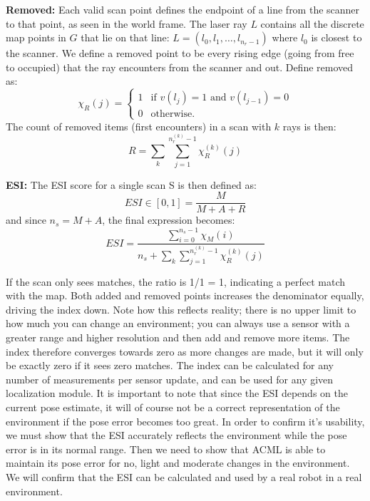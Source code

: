 \textbf{Removed:}
Each valid scan point defines the endpoint of a line from the scanner to that point, as seen in the world frame.
The laser ray $L$ contains all the discrete map points in $G$ that lie on that line:
$L = (l_0, l_1, \dots, l_{n_r-1})$ where $l_0$ is closest to the scanner.
We define a removed point to be every rising edge (going from free to occupied) that the ray encounters from the scanner and out.
Define removed as:
\begin{equation}
\chi_R(j) = \begin{cases} 1 & \text{if } v(l_j) = 1 \text{ and } v(l_{j-1}) = 0 \\ 0 & \text{otherwise}. \end{cases}
\end{equation}
The count of removed items (first encounters) in a scan with $k$ rays is then:
\begin{equation}
R = \sum_{k}\sum_{j=1}^{n_r^{(k)}-1} \chi_R^{(k)}(j)
\end{equation}

\textbf{ESI:}
The ESI score for a single scan S is then defined as:
\begin{equation}
ESI \in [0,1] = \frac{M}{M+A+R}
\end{equation}
and since $n_s = M + A$, the final expression becomes:
\begin{equation}
ESI = \frac{\sum_{i=0}^{n_s-1}\chi_M(i)}{n_s+\sum_{k}\sum_{j=1}^{n_r^{(k)}-1} \chi_R^{(k)}(j)}
\end{equation}

If the scan only sees matches, the ratio is 1/1 = 1, indicating a perfect match with the map.
Both added and removed points increases the denominator equally, driving the index down.  
Note how this reflects reality; there is no upper limit to how much you can change an environment; you can always use a sensor 
with a greater range and higher resolution and then add and remove more items. 
The index therefore converges towards zero as more changes are made, but it will only be exactly zero if it sees zero matches.
The index can be calculated for any number of measurements per sensor update, and can be used for any given localization module.
It is important to note that since the ESI depends on the current pose estimate, it will of course not be a correct 
representation of the environment if the pose error becomes too great. In order to confirm it's usability, we must
show that the ESI accurately reflects the environment while the pose error is in its normal range. Then we need to show that
ACML is able to maintain its pose error for no, light and moderate changes in the environment. We will confirm that the ESI
can be calculated and used by a real robot in a real environment.



